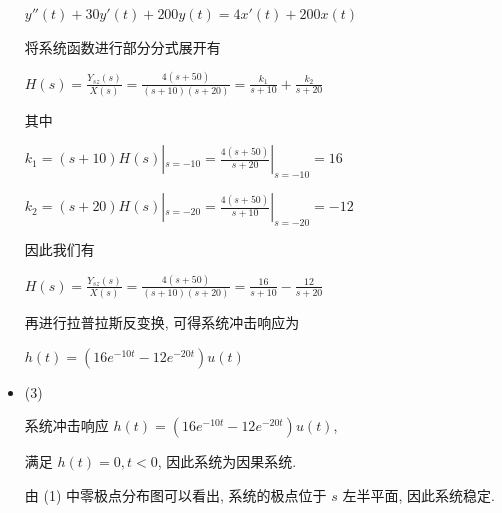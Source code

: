 \documentclass[a4paper,UTF8]{article}
\numberwithin{equation}{section}
\begin{document}
\begin{framed}
\begin{spacing}{1.5}
\begin{itemize}
        $\displaystyle y''(t) + 30y'(t) + 200y(t) = 4x'(t) + 200x(t)$
        
        将系统函数进行部分分式展开有
        
        $\displaystyle H(s) = \frac{Y_{sz}(s)}{X(s)} = \frac{4 (s + 50)}{(s + 10) (s + 20)} = \frac{k_1}{s + 10} + \frac{k_2}{s + 20}$
        
        其中
        
        $\displaystyle k_1 = (s+10)H(s)|_{s=-10} = \frac{4(s+50)}{s+20}|_{s=-10} = 16$
        
        $\displaystyle k_2 = (s+20)H(s)|_{s=-20} = \frac{4(s+50)}{s+10}|_{s=-20} = -12$
        
        因此我们有
        
        $\displaystyle H(s) = \frac{Y_{sz}(s)}{X(s)} = \frac{4 (s + 50)}{(s + 10) (s + 20)} = \frac{16}{s + 10} - \frac{12}{s + 20}$
        
        再进行拉普拉斯反变换, 可得系统冲击响应为
        
        $\displaystyle h(t) = (16e^{-10t} - 12e^{-20t})u(t)$
        
        \item (3)
        
        系统冲击响应 $\displaystyle h(t) = (16e^{-10t} - 12e^{-20t})u(t)$,
        
        满足 $h(t) = 0, t < 0$, 因此系统为因果系统.
        
        由 (1) 中零极点分布图可以看出, 系统的极点位于 $s$ 左半平面, 因此系统稳定.
        
        
      \end{itemize}
    \end{spacing}
  \end{framed}
	
\end{document}
